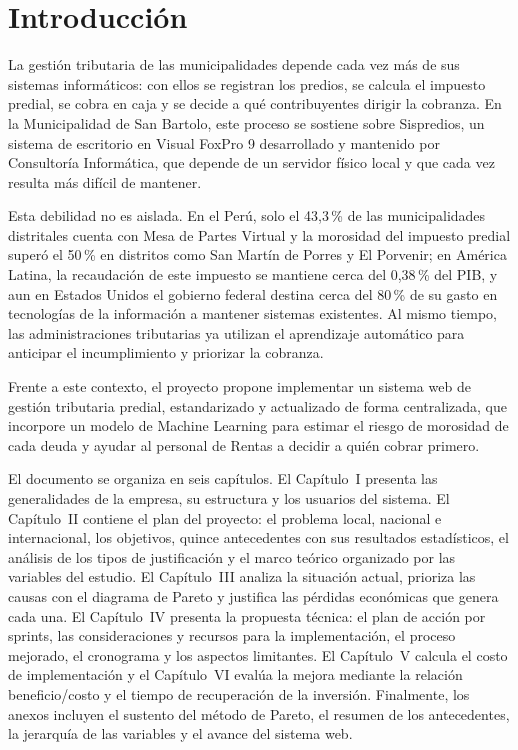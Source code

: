 \documentclass[12pt,a4paper]{report}
\newcounter{anexo}
\begin{document}
\chapter*{Introducción}

La gestión tributaria de las municipalidades depende cada vez más de sus sistemas informáticos: con ellos se registran los predios, se calcula el impuesto predial, se cobra en caja y se decide a qué contribuyentes dirigir la cobranza. En la Municipalidad de San Bartolo, este proceso se sostiene sobre Sispredios, un sistema de escritorio en Visual FoxPro 9 desarrollado y mantenido por Consultoría Informática, que depende de un servidor físico local y que cada vez resulta más difícil de mantener.

Esta debilidad no es aislada. En el Perú, solo el 43,3\,\% de las municipalidades distritales cuenta con Mesa de Partes Virtual y la morosidad del impuesto predial superó el 50\,\% en distritos como San Martín de Porres y El Porvenir; en América Latina, la recaudación de este impuesto se mantiene cerca del 0,38\,\% del PIB, y aun en Estados Unidos el gobierno federal destina cerca del 80\,\% de su gasto en tecnologías de la información a mantener sistemas existentes. Al mismo tiempo, las administraciones tributarias ya utilizan el aprendizaje automático para anticipar el incumplimiento y priorizar la cobranza.

Frente a este contexto, el proyecto propone implementar un sistema web de gestión tributaria predial, estandarizado y actualizado de forma centralizada, que incorpore un modelo de Machine Learning para estimar el riesgo de morosidad de cada deuda y ayudar al personal de Rentas a decidir a quién cobrar primero.

El documento se organiza en seis capítulos. El Capítulo~I presenta las generalidades de la empresa, su estructura y los usuarios del sistema. El Capítulo~II contiene el plan del proyecto: el problema local, nacional e internacional, los objetivos, quince antecedentes con sus resultados estadísticos, el análisis de los tipos de justificación y el marco teórico organizado por las variables del estudio. El Capítulo~III analiza la situación actual, prioriza las causas con el diagrama de Pareto y justifica las pérdidas económicas que genera cada una. El Capítulo~IV presenta la propuesta técnica: el plan de acción por sprints, las consideraciones y recursos para la implementación, el proceso mejorado, el cronograma y los aspectos limitantes. El Capítulo~V calcula el costo de implementación y el Capítulo~VI evalúa la mejora mediante la relación beneficio/costo y el tiempo de recuperación de la inversión. Finalmente, los anexos incluyen el sustento del método de Pareto, el resumen de los antecedentes, la jerarquía de las variables y el avance del sistema web.
\end{document}
